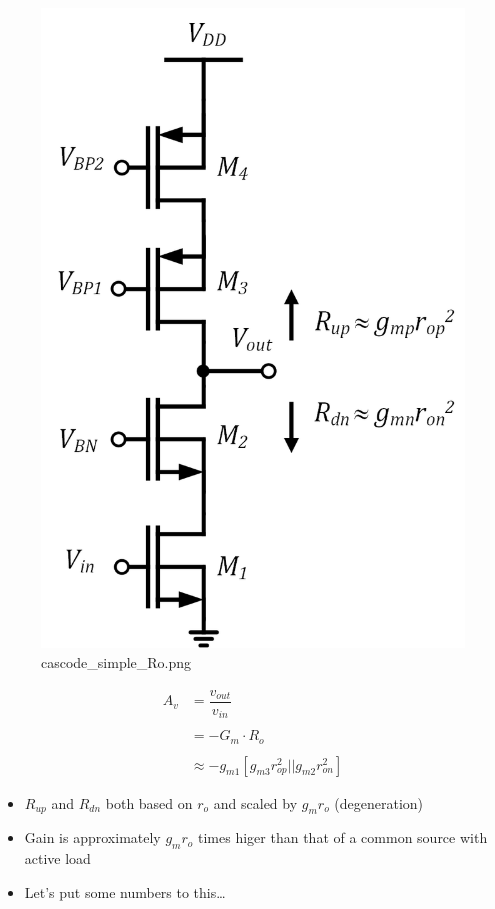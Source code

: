 \documentclass[11pt]{article}
\providecommand{\tightlist}{%
      \setlength{\itemsep}{0pt}\setlength{\parskip}{0pt}}
\begin{document}
    \begin{figure}
\centering
\includegraphics{cascode_simple_Ro.png}
\caption{cascode\_simple\_Ro.png}
\end{figure}

    \begin{align}
A_v &= \dfrac{v_{out}}{v_{in}} \\
\\
&= -G_m\cdot R_o \\
\\
&\approx \boxed{-g_{m1}[g_{m3}r_{op}^2||g_{m2}r_{on}^2]}
\end{align}

    \begin{itemize}
\tightlist
\item
  \(R_{up}\) and \(R_{dn}\) both based on \(r_o\) and scaled by
  \(g_mr_o\) (degeneration)
\item
  Gain is approximately \(g_mr_o\) times higer than that of a common
  source with active load
\item
  Let's put some numbers to this\ldots{}
\end{itemize}
\end{document}
